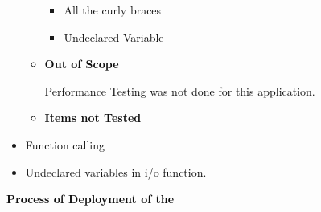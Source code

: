 \documentclass[12pt]{report}
\renewcommand{\_}{\kern-1.5pt\textunderscore\kern-1.5pt}
\begin{document}
\begin{itemize}
\begin{itemize}
\begin{itemize}
	\item {\fontsize{13pt}{15.6pt}\selectfont \textcolor[HTML]{0D0D0D}{All the curly braces}\par}\par

	\item {\fontsize{13pt}{15.6pt}\selectfont \textcolor[HTML]{0D0D0D}{Undeclared Variable}\par}
\end{itemize}\par


\vspace{\baselineskip}

\vspace{\baselineskip}
	\item {\fontsize{13pt}{15.6pt}\selectfont \textbf{\textcolor[HTML]{0D0D0D}{Out of Scope}}\par}\par

\textcolor[HTML]{0D0D0D}{Performance Testing was not done for this application.}\par


\vspace{\baselineskip}

\vspace{\baselineskip}
	\item {\fontsize{13pt}{15.6pt}\selectfont \textbf{\textcolor[HTML]{0D0D0D}{Items not Tested}}\par}
\end{itemize}
\end{itemize}\par


\vspace{\baselineskip}\begin{itemize}
	\item {\fontsize{13pt}{15.6pt}\selectfont \textcolor[HTML]{0D0D0D}{Function calling}\par}\par

	\item {\fontsize{13pt}{15.6pt}\selectfont \textcolor[HTML]{0D0D0D}{Undeclared variables in i/o function.}\par}
\end{itemize}\par


\vspace{\baselineskip}

\vspace{\baselineskip}
\begin{adjustwidth}{-0.1in}{0.84in}
\begin{FlushRight}
{\fontsize{24pt}{28.8pt}\selectfont \textbf{\textcolor[HTML]{0D0D0D}{Process of Deployment of the}}\par}
\end{FlushRight}\par

\end{adjustwidth}
\end{document}
